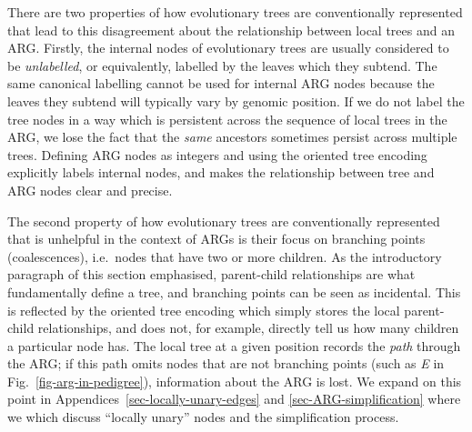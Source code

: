 \documentclass[9pt,twocolumn,twoside]{gsajnl}
\newcommand{\noderef}[1]{\textit{#1}}
\begin{document}
There are two properties of how evolutionary trees are conventionally
represented that lead to this
disagreement about the relationship between local trees and an ARG.
Firstly, the internal nodes of evolutionary trees are usually considered to be
\emph{unlabelled}, or equivalently, labelled by the leaves which they subtend.
The same canonical labelling cannot be used for internal ARG nodes because the
leaves they subtend will typically vary by genomic position. If we do not label
the tree nodes in a way which is persistent across the sequence of local trees
in the ARG, we lose the fact that the \emph{same} ancestors sometimes persist
across multiple trees.
Defining ARG nodes as integers and using the oriented
tree encoding explicitly labels internal nodes, and makes the relationship
between tree and ARG nodes clear and precise.

The second property of how evolutionary trees
are conventionally represented that is unhelpful in the context of ARGs is their
focus on branching points (coalescences), i.e.\ nodes that have two or more children.
As the introductory paragraph of this section emphasised,
parent-child relationships are what fundamentally define a tree,
and branching points can be seen as incidental. This is reflected
by the oriented tree encoding which simply stores the local
parent-child relationships, and does not, for example,
directly tell us how many children a particular node has.
The local tree at a given position records the \emph{path} through
the ARG; if this path omits nodes that are not
branching points (such as \noderef{E} in Fig.~\ref{fig-arg-in-pedigree}),
information about the ARG is lost.
We expand on this point in Appendices~\ref{sec-locally-unary-edges} and
\ref{sec-ARG-simplification}
where we which discuss ``locally unary'' nodes and the simplification process.
\end{document}
